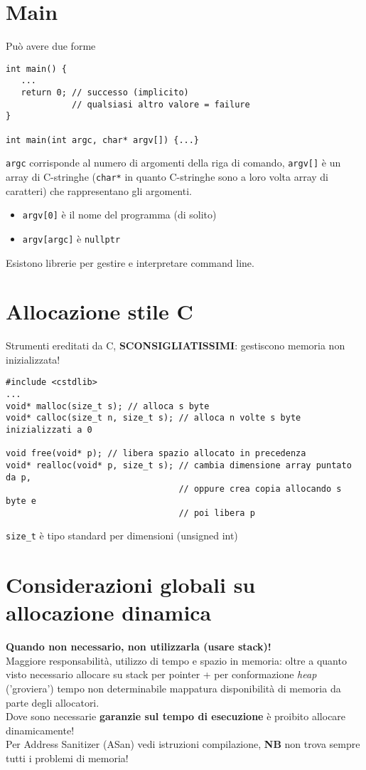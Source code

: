 \documentclass[10pt, oneside]{Book}
\begin{document}
\section{Main}
Può avere due forme
\begin{verbatim}
int main() {
   ...
   return 0; // successo (implicito)
             // qualsiasi altro valore = failure
}

int main(int argc, char* argv[]) {...}
\end{verbatim}
\texttt{argc} corrisponde al numero di argomenti della riga di comando, \texttt{argv[]} è un array di C-stringhe (\texttt{char*} in quanto C-stringhe sono a loro volta array di caratteri) che rappresentano gli argomenti.
\begin{itemize}
\item \texttt{argv[0]} è il nome del programma (di solito)
\item \texttt{argv[argc]} è \texttt{nullptr}
\end{itemize}
Esistono librerie per gestire e interpretare command line.

\section{Allocazione stile C}
Strumenti ereditati da C, \textbf{SCONSIGLIATISSIMI}: gestiscono memoria non inizializzata!
\begin{verbatim}
#include <cstdlib>
...
void* malloc(size_t s); // alloca s byte
void* calloc(size_t n, size_t s); // alloca n volte s byte inizializzati a 0

void free(void* p); // libera spazio allocato in precedenza
void* realloc(void* p, size_t s); // cambia dimensione array puntato da p,
                                  // oppure crea copia allocando s byte e
                                  // poi libera p
\end{verbatim}
\texttt{size\_t} è tipo standard per dimensioni (unsigned int)

\section{Considerazioni globali su allocazione dinamica}
\textbf{Quando non necessario, non utilizzarla (usare stack)!}
\\Maggiore responsabilità, utilizzo di tempo e spazio in memoria: oltre a quanto visto necessario allocare su stack per pointer + per conformazione \textit{heap} ('groviera') tempo non determinabile mappatura disponibilità di memoria da parte degli allocatori.
\\Dove sono necessarie \textbf{garanzie sul tempo di esecuzione} è proibito allocare dinamicamente!
\\Per Address Sanitizer (ASan) vedi istruzioni compilazione, \textbf{NB} non trova sempre tutti i problemi di memoria!
\end{document}
